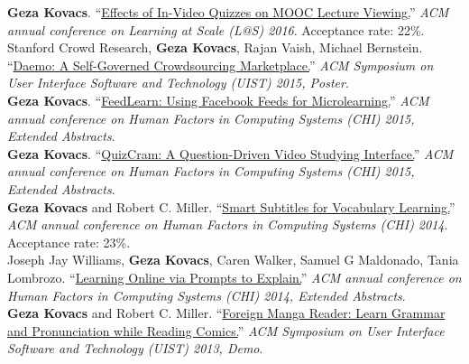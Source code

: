 \textbf{Geza Kovacs}. ``\href{https://hci.stanford.edu/publications/2016/invideo/invideo-las2016.pdf}{Effects of In-Video Quizzes on MOOC Lecture Viewing.}'' \emph{ACM annual conference on Learning at Scale (L@S) 2016}. Acceptance rate: 22\%.\\


{\small Stanford Crowd Research,} \textbf{Geza Kovacs}, {\small Rajan Vaish, Michael Bernstein.} ``\href{https://hci.stanford.edu/publications/2015/crowdresearch/daemo-uist.pdf}{Daemo: A Self-Governed Crowdsourcing Marketplace.}'' \emph{ACM Symposium on User Interface Software and Technology (UIST) 2015, Poster}.\\

\textbf{Geza Kovacs}. ``\href{https://hci.stanford.edu/publications/2015/feedlearn/feedlearn-chi2015.pdf}{FeedLearn: Using Facebook Feeds for Microlearning.}'' \emph{ACM annual conference on Human Factors in Computing Systems (CHI) 2015, Extended Abstracts}.\\ %

\textbf{Geza Kovacs}. ``\href{https://hci.stanford.edu/publications/2015/quizcram/quizcram-chi2015.pdf}{QuizCram: A Question-Driven Video Studying Interface.}'' \emph{ACM annual conference on Human Factors in Computing Systems (CHI) 2015, Extended Abstracts}.\\

\textbf{Geza Kovacs} {\small and Robert C. Miller.} ``\href{http://up.csail.mit.edu/other-pubs/chi2014-smartsubs.pdf}{Smart Subtitles for Vocabulary Learning.}'' \emph{ACM annual conference on Human Factors in Computing Systems (CHI) 2014}. Acceptance rate: 23\%.\\

{\small Joseph Jay Williams,} \textbf{Geza Kovacs}, {\small Caren Walker, Samuel G Maldonado, Tania Lombrozo.} ``\href{https://hci.stanford.edu/publications/2014/explain/explain-chi2014.pdf}{Learning Online via Prompts to Explain.}'' \emph{ACM annual conference on Human Factors in Computing Systems (CHI) 2014, Extended Abstracts}.\\

\textbf{Geza Kovacs} {\small and Robert C. Miller.} ``\href{http://up.csail.mit.edu/other-pubs/uist2013-mangareader.pdf}{Foreign Manga Reader: Learn Grammar and Pronunciation while Reading Comics.}'' \emph{ACM Symposium on User Interface Software and Technology (UIST) 2013, Demo}.\\

